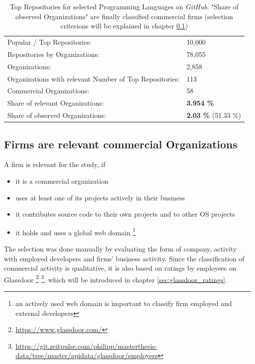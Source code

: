 \begin{table}[!h]
\centering
\begin{tabular}{ll}
Popular / Top Repositories:  						& 10,000         	\\
Repositories by Organizations:		& 78,055					\\
Organizations:  									& 2,858          \\
Organizations with relevant Number of Top Repositories:  					& 113          \\
Commercial Organizations:  					& 58          \\
Share of relevant Organizations:  & \textbf{3.954 \%}		\\
Share of observed Organizations:  & \textbf{2.03 \%} \/ \scriptsize{(51.33 \%)}
\end{tabular}
\caption{Top Repositories for selected Programming Languages on \textit{GitHub}. "Share of observed Organizations" are finally classified commercial firms (selection criterions will be explained in chapter \ref{sec:firms_are_relevant_commercial_organizations})}
\label{tbl:rep_numbers_organization}
\end{table}

\clearpage
\subsection{Firms are relevant commercial Organizations}
\label{sec:firms_are_relevant_commercial_organizations}
A firm is relevant for the study, if

\begin{itemize}
	\item it is a commercial organization
	\item uses at least one of its projects actively in their business
	\item it contributes source code to their own projects and to other OS projects
	\item it holds and uses a global web domain \footnote{an actively used web domain is important to classify firm employed and external developers}
\end{itemize}

The selection was done manually by evaluating the form of company, activity with employed developers and firms' business activity. Since the classification of commercial activity is qualitative, it is also based on ratings by employees on Glassdoor \footnote{\url{https://www.glassdoor.com/}} \footnote{\url{https://git.zeitpulse.com/philipp/masterthesis-data/tree/master/apidata/glassdoor/employers}}, which will be introduced in chapter \ref{sec:glassdoor_ratings}.

